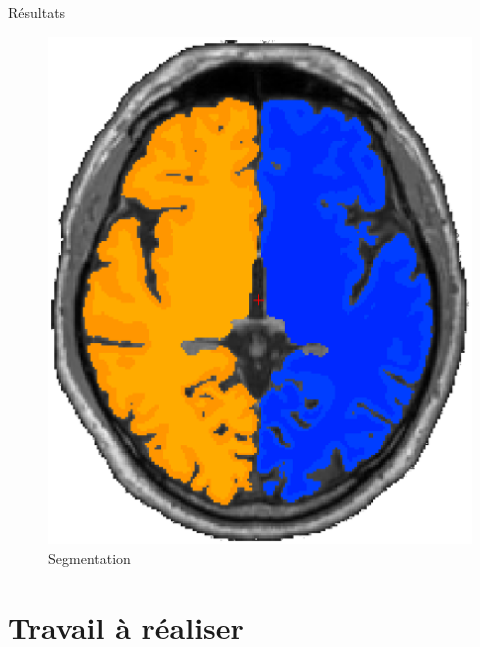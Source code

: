 \documentclass{beamer}
\begin{document}
\begin{frame}[t]{Résultats}
  \begin{figure}
    \includegraphics{annex/segmentation}
    \caption{Segmentation}
    \label{seg}
  \end{figure}
\end{frame}

\section{Travail à réaliser}

\subsection*{}
\end{document}
